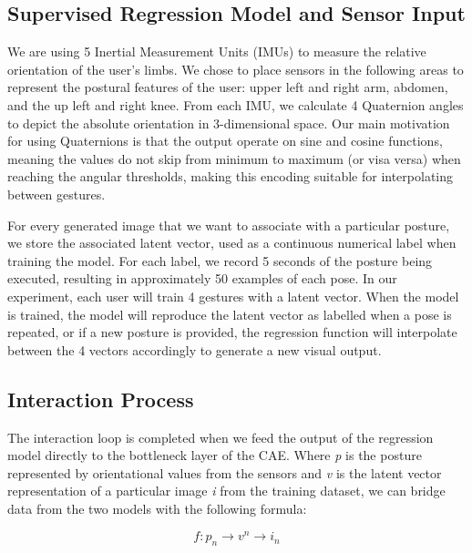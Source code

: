 \subsection{Supervised Regression Model and Sensor Input}\label{sensor_input}

We are using {5} Inertial Measurement Units (IMUs) to measure the relative orientation of the user’s limbs. We chose to place sensors in the following areas to represent the postural features of the user: {upper left and right arm, abdomen, and the up left and right knee}. From each IMU, we calculate 4 Quaternion angles to depict the  absolute orientation in 3-dimensional space. Our main motivation for using Quaternions is that the output operate on sine and cosine functions, meaning the values do not skip from minimum to maximum (or visa versa) when reaching the angular thresholds, making this encoding suitable for interpolating between gestures.

For every generated image that we want to associate with a particular posture, we store the associated latent vector, used as a continuous numerical label when training the model. For each label, we record 5 seconds of the posture being executed, resulting in approximately 50 examples of each pose. In our experiment, each user will train 4 gestures with a latent vector. When the model is trained, the model will reproduce the latent vector as labelled when a pose is repeated, or if a new posture is provided, the regression function will interpolate between the 4 vectors accordingly to generate a new visual output.

\subsection{Interaction Process}

The interaction loop is completed when we feed the output of the regression model directly to the bottleneck layer of the CAE. Where \textit{p} is the posture represented by orientational values from the sensors and \textit{v} is the latent vector representation of a particular image \textit{i} from the training dataset, we can bridge data from the two models with the following formula:

\[ f:p_n\xrightarrow{}v^n \xrightarrow{}i_n \]

